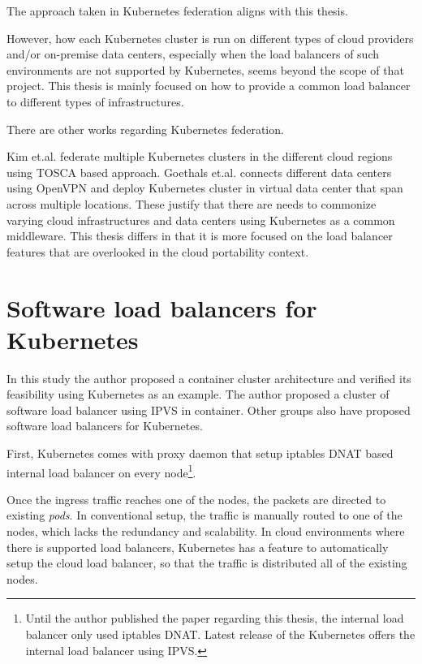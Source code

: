 The approach taken in Kubernetes federation aligns with this thesis.

However, how each Kubernetes cluster is run on different types of cloud providers
and/or on-premise data centers, especially when the load balancers of such environments are not supported by Kubernetes, 
seems beyond the scope of that project.
This thesis is mainly focused on how to provide a common load balancer to different types of infrastructures.

There are other works \cite{kim2019tosca,goethals2019fuse} regarding Kubernetes federation. 


Kim et.al. \cite{kim2019tosca} federate multiple Kubernetes clusters in the different cloud regions using TOSCA \cite{standard2013topology,binz2012portable} based approach.
Goethals et.al.\cite{goethals2019fuse} connects different data centers using OpenVPN \cite{feilner2006openvpn} and deploy Kubernetes cluster in virtual data center that span across multiple locations.
These justify that there are needs to commonize varying cloud infrastructures and data centers using Kubernetes as a common middleware.
This thesis differs in that it is more focused on the load balancer features that are overlooked in the cloud portability context.





\section{Software load balancers for Kubernetes}


In this study the author proposed a container cluster architecture and verified its feasibility using Kubernetes as an example.
The author proposed a cluster of software load balancer using IPVS in container.
Other groups also have proposed software load balancers for Kubernetes.







First, Kubernetes comes with proxy daemon that setup iptables DNAT based internal load balancer on every node\footnote{
Until the author published the paper \cite{takahashi2018portable} regarding this thesis, the internal load balancer only used iptables DNAT.
Latest release of the Kubernetes offers the internal load balancer using IPVS.
}.
%

Once the ingress traffic reaches one of the nodes, the packets are directed to existing {\em pods}.
In conventional setup, the traffic is manually routed to one of the nodes, which lacks the redundancy and scalability.
In cloud environments where there is supported load balancers, Kubernetes has a feature to automatically setup the cloud load balancer, so that the traffic is distributed all of the existing nodes. 

